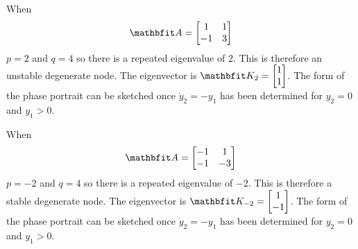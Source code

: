 \begin{example}
When 
$$\vect{A}=\begin{bmatrix} 1 & 1 \\ -1 & 3 \end{bmatrix}$$
$p=2$ and $q=4$ so
there is a repeated eigenvalue of $2$.  This is therefore an unstable
degenerate node.  The eigenvector is $\vect{K}_{2}=\begin{bmatrix} 1 \\ 1 
\end{bmatrix}$.  The form of the phase portrait can be sketched
once $\dot{y}_2=-y_1$ has been determined for $y_2=0$ and $y_1>0$.

\begin{center}
\end{center}
\end{example}

\begin{example}
When 
$$\vect{A}=\begin{bmatrix} -1 & 1 \\ -1 & -3 \end{bmatrix}$$
$p=-2$ and $q=4$ so
there is a repeated eigenvalue of $-2$.  This is therefore a stable
degenerate node.  The eigenvector is $\vect{K}_{-2}=\begin{bmatrix} 1 \\ -1 
\end{bmatrix}$.  The form of the phase portrait can be sketched
once $\dot{y}_2=-y_1$ has been determined for $y_2=0$ and $y_1>0$.

\begin{center}
\end{center}
\end{example}

